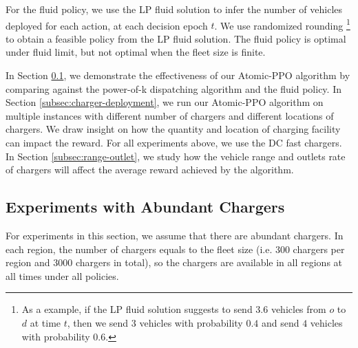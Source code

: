 For the fluid policy, we use the LP fluid solution to infer the number of vehicles deployed for each action, at each decision epoch $t$. We use randomized rounding \footnote{As a example, if the LP fluid solution suggests to send 3.6 vehicles from $o$ to $d$ at time $t$, then we send $3$ vehicles with probability $0.4$ and send $4$ vehicles with probability $0.6$.} to obtain a feasible policy from the LP fluid solution. The fluid policy is optimal under fluid limit, but not optimal when the fleet size is finite.



In Section \ref{subsec:superior}, we demonstrate the effectiveness of our Atomic-PPO algorithm by comparing against the power-of-k dispatching algorithm and the fluid policy. In Section \ref{subsec:charger-deployment}, we run our Atomic-PPO algorithm on multiple instances with different number of chargers and different locations of chargers. We draw insight on how the quantity and location of charging facility can impact the reward. For all experiments above, we use the DC fast chargers. In Section \ref{subsec:range-outlet}, we study how the vehicle range and outlets rate of chargers will affect the average reward achieved by the algorithm.

\subsection{Experiments with Abundant Chargers} \label{subsec:superior}
For experiments in this section, we assume that there are abundant chargers. In each region, the number of chargers equals to the fleet size (i.e. 300 chargers per region and 3000 chargers in total), so the chargers are available in all regions at all times under all policies. 

